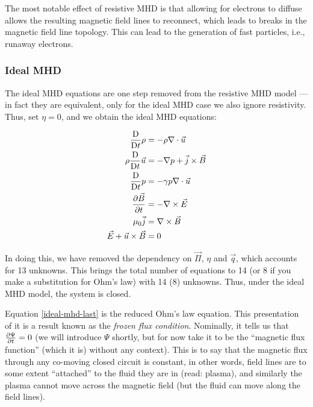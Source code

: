 \begin{remark}
    The most notable effect of resistive MHD is that allowing for electrons to diffuse allows the resulting magnetic field lines 
    to reconnect, which leads to breaks in the magnetic field line topology. This can lead to the generation of fast particles, i.e., 
    runaway electrons.
\end{remark}


\subsubsection{Ideal MHD}
The ideal MHD equations are one step removed from the resistive MHD model --- in fact they are equivalent, only for the ideal MHD case 
we also ignore resistivity. Thus, set $\eta = 0$, and we obtain the ideal MHD equations:
\begin{definition}
    \begin{align}
        \label{ideal-mhd-first}
        \frac{\text{D}}{\text{D} t} \rho &= -\rho \nabla \cdot \vec{u} \\
        \rho \frac{\text{D}}{\text{D} t} \vec{u} &= -\nabla p + \vec{j} \times \vec{B}\\
        \frac{\text{D}}{\text{D} t} p  &= -\gamma p \nabla \cdot \vec{u} \\
        \pdv{\vec{B}}{t} &= -\nabla \times \vec{E} \\
        \mu_0 \vec{j} &= \nabla \times \vec{B} \\
        \vec{E} + \vec{u} \times \vec{B} &= 0 \label{ideal-mhd-last}
    \end{align}
\end{definition}

\begin{remark}
    In doing this, we have removed the dependency on $\vec{\Pi}$, $\eta$ and $\vec{q}$, which accounts 
    for 13 unknowns. This brings the total number of equations to 14 (or $8$ if you make a substitution 
    for Ohm's law) with 14 ($8$) unknowns. Thus, under the ideal MHD model, the system is closed.
\end{remark}

\begin{remark}
    Equation \eqref{ideal-mhd-last} is the reduced Ohm's law equation. This presentation of it is a result 
    known as the \textit{frozen flux condition}. Nominally, it tells us that $\pdv{\Psi}{t} = 0$ (we will 
    introduce $\Psi$ shortly, but for now take it to be the ``magnetic flux function'' (which it is) without 
    any context). This is to say that the magnetic flux through any co-moving closed circuit is constant,
    in other words, field lines are to some extent ``attached'' to the fluid they are in (read: plasma), and 
    similarly the plasma cannot move across the magnetic field (but the fluid can move along the field lines).
\end{remark}

